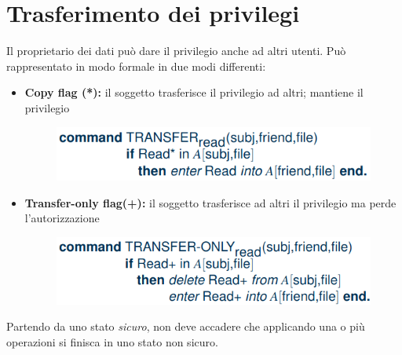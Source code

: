 \documentclass{report}
\begin{document}
\section{Trasferimento dei privilegi}
Il proprietario dei dati può dare il privilegio anche ad altri utenti.
Può rappresentato in modo formale in due modi differenti:
\begin{itemize}
    \item \textbf{Copy flag (*):} il soggetto trasferisce il privilegio ad altri; mantiene il privilegio
    \begin{figure}[H]
        \centering
        \includegraphics[width=0.6\linewidth]{images/transfer1.png}
    \end{figure}
    \item \textbf{Transfer-only flag(+):} il soggetto trasferisce ad altri il privilegio ma perde l'autorizzazione
    \begin{figure}[H]
        \centering
        \includegraphics[width=0.6\linewidth]{images/transfer2.png}
    \end{figure}
\end{itemize}

\noindent Partendo da uno stato \textit{sicuro}, non deve accadere che applicando una o più operazioni 
si finisca in uno stato non sicuro.
\end{document}
